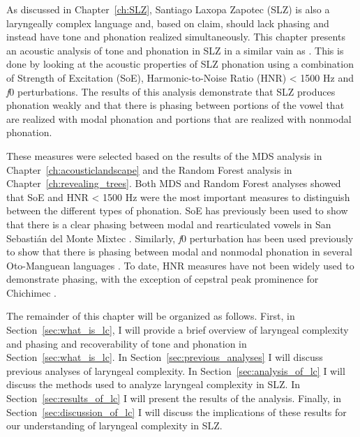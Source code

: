 As discussed in Chapter~\ref{ch:SLZ}, Santiago Laxopa Zapotec (SLZ) is also a laryngeally complex language and, based on  claim, should lack phasing and instead have tone and phonation realized simultaneously. This chapter presents an acoustic analysis of tone and phonation in SLZ in a similar vain as \citet{dicanioCoarticulationToneGlottal2012,garellekAcousticConsequencesPhonation2011,keltererPhonationTypeContrasts2020,wellerInteractionsToneGlottalization2023,wellerLexicalToneVowel2023,wellerVoiceQualityTone2024}. This is done by looking at the acoustic properties of SLZ phonation using a combination of Strength of Excitation (SoE), Harmonic-to-Noise Ratio (HNR) < 1500 Hz and \textit{f}0 perturbations. The results of this analysis demonstrate that SLZ produces phonation weakly and that there is phasing between portions of the vowel that are realized with modal phonation and portions that are realized with nonmodal phonation.

These measures were selected based on the results of the MDS analysis in Chapter~\ref{ch:acousticlandscape} and the Random Forest analysis in Chapter~\ref{ch:revealing_trees}. Both MDS and Random Forest analyses showed that SoE and HNR < 1500 Hz were the most important measures to distinguish between the different types of phonation. SoE has previously been used to show that there is a clear phasing between modal and rearticulated vowels in San Sebastián del Monte Mixtec \citep{wellerInteractionsToneGlottalization2023,wellerLexicalToneVowel2023,wellerVoiceQualityTone2024}. Similarly, \textit{f}0 perturbation has been used previously to show that there is phasing between modal and nonmodal phonation in several Oto-Manguean languages \citep{garellekAcousticConsequencesPhonation2011,dicanioCoarticulationToneGlottal2012,keltererPhonationTypeContrasts2020}. To date, HNR measures have not been widely used to demonstrate phasing, with the exception of cepstral peak prominence for Chichimec \citep{keltererPhonationTypeContrasts2020}. 

The remainder of this chapter will be organized as follows. First, in Section~\ref{sec:what_is_lc}, I will provide a brief overview of laryngeal complexity and phasing and recoverability of tone and phonation in Section~\ref{sec:what_is_lc}. In Section~\ref{sec:previous_analyses} I will discuss previous analyses of laryngeal complexity. In Section~\ref{sec:analysis_of_lc} I will discuss the methods used to analyze laryngeal complexity in SLZ. In Section~\ref{sec:results_of_lc} I will present the results of the analysis. Finally, in Section~\ref{sec:discussion_of_lc} I will discuss the implications of these results for our understanding of laryngeal complexity in SLZ.


